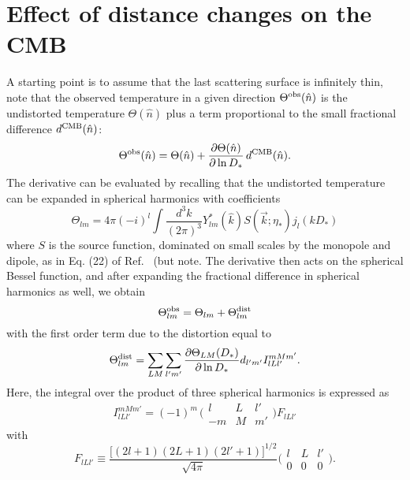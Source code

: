 \documentclass[prl,amsmath,amssymb,floatfix,superscriptaddress,nofootinbib,twocolumn]{revtex4-1}
\def\be{\begin{equation}}
\def\ee{\end{equation}}
\begin{document}
\section{Effect of distance changes on the CMB}
\newcommand\fd{d^{\rm CMB}}
\newcommand\tob{\Theta^{\rm obs}}
\newcommand\tu{\Theta}
\newcommand\td{\Theta^{\rm dist}}
A starting point is to assume that the last scattering surface is infinitely thin, note that the observed temperature in a given direction $\tob(\hat n)$ is the undistorted temperature $\tu(\hat n)$ plus a term proportional to the small fractional difference $\fd(\hat n)$:
\be
\tob(\hat n) = \tu(\hat n) + \frac{\partial\tu(\hat n)}{\partial \ln D_*}\, \fd(\hat n)
.\ee
The derivative can be evaluated by recalling that the undistorted temperature can be expanded in spherical harmonics with coefficients
\be
\tu_{lm} = 4\pi(-i)^{l} \int \frac{d^{3}k}{(2\pi)^{3}}Y_{lm}^{*}(\hat{k})S(\vec k;\eta_{*})j_{l}(kD_{*}) 
\ee
where $S$ is the source function, dominated on small scales by the monopole and dipole, as in Eq. (22) of Ref.~\cite{Hu:2001bc} (but note. The derivative then acts on the spherical Bessel function, and after expanding the fractional difference in spherical harmonics as well, we obtain
\be
\tob_{lm} = \tu_{lm} + \td_{lm}
\ee
with the first order term due to the distortion equal to
\be
\td_{lm} = \sum_{LM}\sum_{l'm'} \frac{\partial \tu_{LM}(D_{*})}{\partial \ln D_{*}} d_{l'm'} I_{lLl'}^{mMm'}
.\ee
Here, the integral over the product of three spherical harmonics is expressed as 
\be
I_{lLl'}^{mMm'}  = (-1)^m\,
\bigl(\begin{smallmatrix} l & L & l' \\ -m & M & m'  \end{smallmatrix}\bigr) F_{lLl'}
\ee
with
\be
F_{lLl'} \equiv \frac{\big[ (2l+1)(2L+1)(2l'+1)\big]^{1/2} }{\sqrt{4 \pi}} \bigl(\begin{smallmatrix} l & L & l' \\ 0 & 0 & 0  \end{smallmatrix}\bigr)
.\ee
\end{document}
